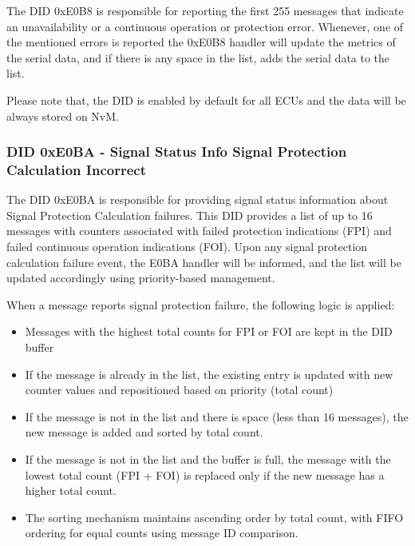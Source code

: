 
The DID 0xE0B8 is responsible for reporting the first 255 messages that indicate an unavailability or a continuous operation or protection error. Whenever, 
one of the mentioned errors is reported the 0xE0B8 handler will update the metrics of the serial data, and if there is any space
in the list, adds the serial data to the list. 

Please note that, the DID is enabled by default for all ECUs and the data will be always stored on NvM.


{}

\subsubsection{DID 0xE0BA - Signal Status Info Signal Protection Calculation Incorrect}
\label{sec:DIDE0BA}

The DID 0xE0BA is responsible for providing signal status information about Signal Protection Calculation failures. This DID provides a list of up to 16 messages with counters associated with failed protection indications (FPI) and failed continuous operation indications (FOI). Upon any signal protection calculation failure event, the E0BA handler will be informed, and the list will be updated accordingly using priority-based management.

When a message reports signal protection failure, the following logic is applied:
\begin{itemize}
    \item Messages with the highest total counts for FPI or FOI are kept in the DID buffer
    \item If the message is already in the list, the existing entry is updated with new counter values and repositioned based on priority (total count)
    \item If the message is not in the list and there is space (less than 16 messages), the new message is added and sorted by total count.
    \item If the message is not in the list and the buffer is full, the message with the lowest total count (FPI + FOI) is replaced only if the new message has a higher total count.
    \item The sorting mechanism maintains ascending order by total count, with FIFO ordering for equal counts using message ID comparison.
\end{itemize}

